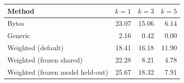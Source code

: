 \begin{tabular}{lrrr}
\toprule
Method & $k=1$ & $k=3$ & $k=5$ \\
\midrule
Bytes & 23.07 & 15.06 & 6.14 \\
Generic & 2.16 & 0.42 & 0.00 \\
Weighted (default) & 18.41 & 16.18 & 11.90 \\
Weighted (frozen shared) & 22.28 & 8.21 & 4.78 \\
Weighted (frozen model held-out) & 25.67 & 18.32 & 7.91 \\
\bottomrule
\end{tabular}
